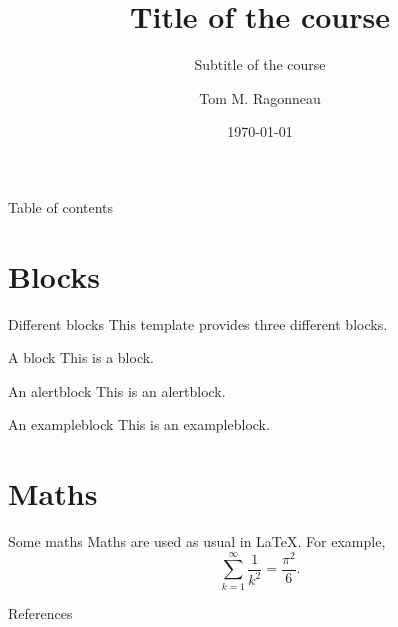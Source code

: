 \documentclass{ragonneau-beamer}
\title{Title of the course}
\subtitle{Subtitle of the course}
\date{\today}
\author{Tom M. Ragonneau}
\institute{
    Department of Applied Mathematics\\ 
    The Hong Kong Polytechnic University
}
\begin{document}
\maketitle

\begin{frame}{Table of contents}
    \tableofcontents[hideallsubsections]
\end{frame}

\section{Blocks}

\begin{frame}{Different blocks}
    This template provides \alert{three} different blocks.

    \begin{block}{A block}
        This is a block.
    \end{block}

    \begin{alertblock}{An alertblock}
        This is an alertblock.
    \end{alertblock}

    \begin{exampleblock}{An exampleblock}
        This is an exampleblock.
    \end{exampleblock}
\end{frame}

\section{Maths}

\begin{frame}{Some maths}
    Maths are used as usual in \LaTeX.
    For example,
    \begin{equation*}
        \sum_{k = 1}^{\infty} \frac{1}{k^2} = \frac{\pi^2}{6}.
    \end{equation*}
\end{frame}

\appendix

\begin{frame}[t,allowframebreaks]{References}
    \nocite{knut86}
    \printbibliography[heading=none]
\end{frame}
\end{document}
